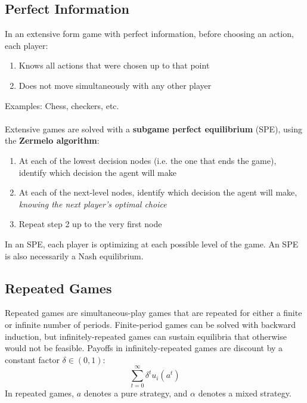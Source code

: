 \documentclass{article}
\begin{document}
\subsection{Perfect Information}
In an extensive form game with perfect information, before choosing an action, each player:
\begin{enumerate}
	\item Knows all actions that were chosen up to that point
	\item Does not move simultaneously with any other player
\end{enumerate}
Examples: Chess, checkers, etc. \\
\\
Extensive games are solved with a \textbf{subgame perfect equilibrium} (SPE), using the \textbf{Zermelo algorithm}:
\begin{enumerate}
	\item At each of the lowest decision nodes (i.e. the one that ends the game), identify which decision the agent will make 
	\item At each of the next-level nodes, identify which decision the agent will make, \textit{knowing the next player's optimal choice}
	\item Repeat step 2 up to the very first node
\end{enumerate}
In an SPE, each player is optimizing at each possible level of the game. An SPE is also necessarily a Nash equilibrium.


\subsection{Repeated Games}
Repeated games are simultaneous-play games that are repeated for either a finite or infinite number of periods. Finite-period games can be solved with backward induction, but infinitely-repeated games can sustain equilibria that otherwise would not be feasible. Payoffs in infinitely-repeated games are discount by a constant factor ${\delta\in(0,1)}$:
\[
	\sum_{t=0}^\infty\delta^tu_i(a^t)
\]
In repeated games, $a$ denotes a pure strategy, and $\alpha$ denotes a mixed strategy.
\end{document}
